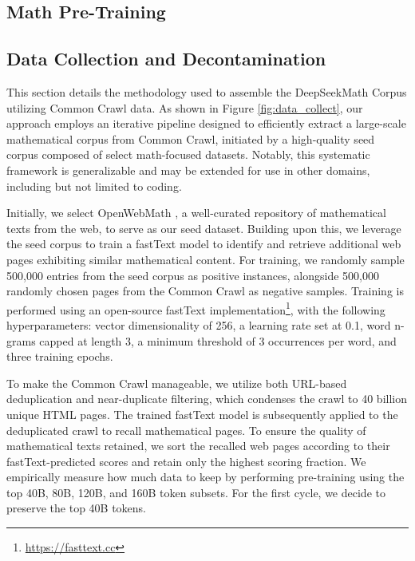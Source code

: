 \begin{itemize}[topsep=0pt]
\section{Math Pre-Training}

\subsection{Data Collection and Decontamination} This section details the methodology used to assemble the DeepSeekMath Corpus utilizing Common Crawl data. As shown in Figure \ref{fig:data_collect}, our approach employs an iterative pipeline designed to efficiently extract a large-scale mathematical corpus from Common Crawl, initiated by a high-quality seed corpus composed of select math-focused datasets. Notably, this systematic framework is generalizable and may be extended for use in other domains, including but not limited to coding.

Initially, we select OpenWebMath \citep{openwebmath}, a well-curated repository of mathematical texts from the web, to serve as our seed dataset. Building upon this, we leverage the seed corpus to train a fastText model \citep{joulin2016fasttext} to identify and retrieve additional web pages exhibiting similar mathematical content. For training, we randomly sample 500,000 entries from the seed corpus as positive instances, alongside 500,000 randomly chosen pages from the Common Crawl as negative samples. Training is performed using an open-source fastText implementation\footnote{\url{https://fasttext.cc}}, with the following hyperparameters: vector dimensionality of 256, a learning rate set at 0.1, word n-grams capped at length 3, a minimum threshold of 3 occurrences per word, and three training epochs.

To make the Common Crawl manageable, we utilize both URL-based deduplication and near-duplicate filtering, which condenses the crawl to 40 billion unique HTML pages. The trained fastText model is subsequently applied to the deduplicated crawl to recall mathematical pages. To ensure the quality of mathematical texts retained, we sort the recalled web pages according to their fastText-predicted scores and retain only the highest scoring fraction. We empirically measure how much data to keep by performing pre-training using the top 40B, 80B, 120B, and 160B token subsets. For the first cycle, we decide to preserve the top 40B tokens.


\end{itemize}
